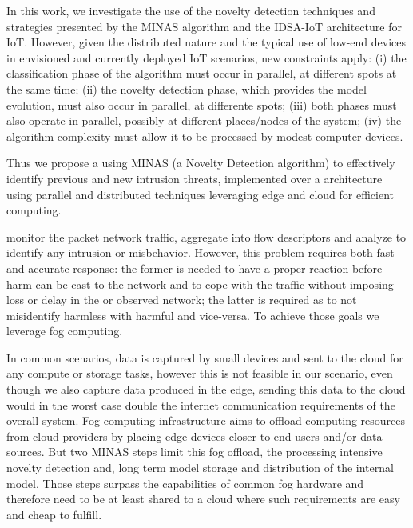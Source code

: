 In this work, we investigate the use of the novelty detection techniques and strategies presented 
by the MINAS algorithm and the IDSA-IoT architecture for IoT.
However, given the distributed nature and the typical use of low-end devices in envisioned and currently deployed IoT scenarios,  
new constraints apply:
(i) the classification phase of the algorithm must occur in parallel, at different spots at the same time;
(ii) the novelty detection phase, which provides the model evolution, must also occur in parallel, at differente spots;
(iii) both phases must also operate in parallel, possibly at different places/nodes of the system;
(iv) the algorithm complexity must allow it to be processed by modest computer devices.


Thus we propose a \nids using MINAS \cite{Faria2016minas} (a Novelty Detection algorithm)
to effectively identify previous and new intrusion threats,
implemented over a architecture \cite{Cassales2019a} using parallel and distributed techniques leveraging
edge and cloud for efficient computing.

\nids 
monitor the packet network traffic, aggregate into flow descriptors and
analyze to identify any intrusion or misbehavior.
However, this problem requires both fast and accurate response:
the former is needed to have a proper reaction before harm can be cast
to the network and to cope with the traffic without imposing loss or delay
in the \nids or observed network;
the latter is required as to not misidentify harmless with harmful and vice-versa.
To achieve those goals we leverage fog computing.


In common \iot scenarios, data is captured by small devices and sent to the
cloud for any compute or storage tasks, however this is not feasible in our
\nids scenario, even though we also capture data produced in the edge,
sending this data to the cloud would in the worst case double the
internet communication requirements of the overall system.
Fog computing infrastructure aims to offload
computing resources from cloud providers by placing edge
devices closer to end-users and/or data sources.
But two MINAS steps limit this fog offload,
the processing intensive novelty detection and,
long term model storage and distribution of the internal model.
Those steps surpass the capabilities of common fog hardware and
therefore need to be at least shared to a cloud where such
requirements are easy and cheap to fulfill.

